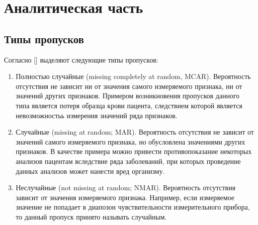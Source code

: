 \chapter{Аналитическая часть} \label{chapt1}

\section{Типы пропусков} \label{sect1_1}

Согласно [] выделяют следующие типы пропусков:
\begin{enumerate}
  \item Полностью случайные (missing completely at random,
    MCAR). Вероятность отсутствия не зависит ни от значения самого
    измеряемого признака, ни от значений других признаков. Примером
    возникновения пропусков данного типа является потеря образца крови
    пацента, следствием которой является невозможностьь измерения значений
    ряда признаков.
  \item Случайные (missing at random; MAR). Вероятность отсутствия не
    зависит от значений самого измеряемого признака, но обусловлена
    значениями других признаков. В качестве примера можно привести
    противопоказание некоторых анализов пацентам вследствие ряда
    заболеваний, при которых проведение данных анализов может нанести вред
    организму.
  \item Неслучайные (not missing at random; NMAR). Вероятность
    отсутствия зависит от значения измеряемого признака. Например, если
    измеряемое значение не попадает в диапозон чувствительности
    измерительного прибора, то данный пропуск принято называть случайным.
\end{enumerate}
